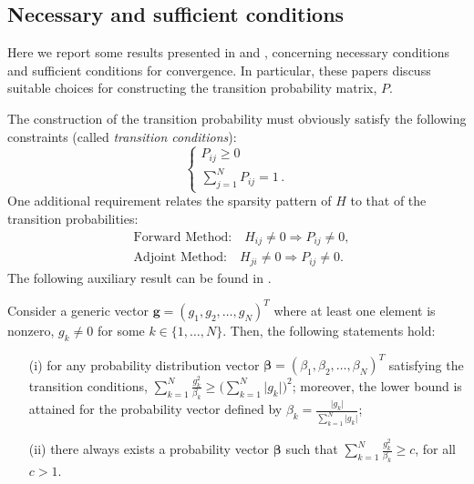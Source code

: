 \documentclass[final,leqno,onefignum,onetabnum]{siamltex1213}
\begin{document}
\subsection{Necessary and sufficient conditions}

Here we report some results presented in 
\cite{Srin2010} and \cite{MASC2013},
concerning necessary conditions and sufficient conditions for convergence.
In particular, these papers discuss suitable choices for constructing the
transition probability matrix, $P$.

The construction of the transition probability must obviously satisfy the following 
constraints (called \textit{transition conditions}):
\[
\begin{cases}
  P_{ij}\ge 0 \\
 \sum_{j=1}^N P_{ij}= 1 \,.
\end{cases}
\]
One additional requirement relates the sparsity pattern of $H$ to that
of the transition probabilities:
\begin{align*}
& \text{Forward Method:} \quad H_{ij}\ne 0 \Rightarrow P_{ij}\ne 0, \\ &
\text{Adjoint Method:} \quad H_{ji}\ne 0 \Rightarrow P_{ij}\ne 0.
\end{align*} 
The following auxiliary result can be found in \cite{MASC2013}.

\begin{lemma}
 Consider a generic vector 
$\mathbf{g}=(g_1,g_2,\ldots,g_N)^T$ where at least 
one element is
nonzero, $g_k\ne0$ for some $k\in\{1,\ldots,N\}$. %
Then, the following statements hold:
\begin{enumerate}
 \item[(i)] for any probability distribution vector 
$\boldsymbol{\beta}=(\beta_1,\beta_2,\ldots,
\beta_N)^T$ satisfying the
transition conditions, $\displaystyle
\sum_{k=1}^N\frac{g_k^2}{\beta_k}\ge \bigg(\sum_{k=1}^N 
\lvert g_k\rvert\bigg)^2$; moreover, the lower bound is attained for
the probability vector defined by $\displaystyle \beta_k=\frac{\lvert
g_k\rvert}{\sum_{k=1}^N \lvert g_k\rvert}$;
\item[(ii)] there always exists a probability vector 
$\boldsymbol{\beta}$ such that $\displaystyle
\sum_{k=1}^N\frac{g_k^2}{\beta_k}\ge c$, for all 
$c>1$.
\end{enumerate}
\label{lemma1}
\end{lemma}
\end{document}
